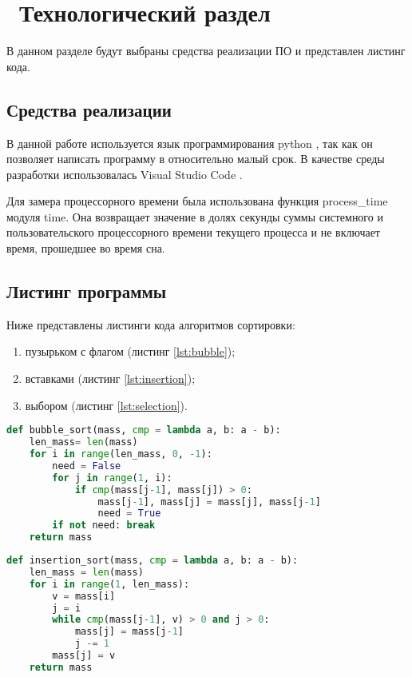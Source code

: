 \chapter{ Технологический раздел}
\label{cha:technological}

    В данном разделе будут выбраны средства реализации ПО и представлен листинг кода. 

    \section{Средства реализации}
        В данной работе используется язык программирования python \cite{python}, так как
        он позволяет написать программу в относительно малый срок.
        В качестве среды разработки использовалась Visual Studio Code \cite{visual-studio-code}.

        Для замера процессорного времени была использована функция process\_time \cite{process_time} модуля time.
        Она возвращает значение в долях секунды суммы системного и пользовательского процессорного времени текущего процесса и 
        не включает время, прошедшее во время сна.

    \section{Листинг программы}
        Ниже представлены листинги кода алгоритмов сортировки:
        \begin{enumerate}
            \item пузырьком с флагом (листинг \ref{lst:bubble});
            \item вставками (листинг \ref{lst:insertion});
            \item выбором (листинг \ref{lst:selection}).
        \end{enumerate}
        
        \begin{lstlisting}[language=python, label=lst:bubble, caption=Реализация алгоритма сортировки пузырьком с флагом]
def bubble_sort(mass, cmp = lambda a, b: a - b):
    len_mass= len(mass)
    for i in range(len_mass, 0, -1):
        need = False
        for j in range(1, i):
            if cmp(mass[j-1], mass[j]) > 0:
                mass[j-1], mass[j] = mass[j], mass[j-1]
                need = True
        if not need: break
    return mass
        \end{lstlisting}

        \begin{lstlisting}[language=python, label=lst:insertion, caption=Реализация алгоритма сортировки вставками]
def insertion_sort(mass, cmp = lambda a, b: a - b):
    len_mass = len(mass)
    for i in range(1, len_mass):
        v = mass[i]
        j = i
        while cmp(mass[j-1], v) > 0 and j > 0:
            mass[j] = mass[j-1]
            j -= 1
        mass[j] = v
    return mass
        \end{lstlisting}

